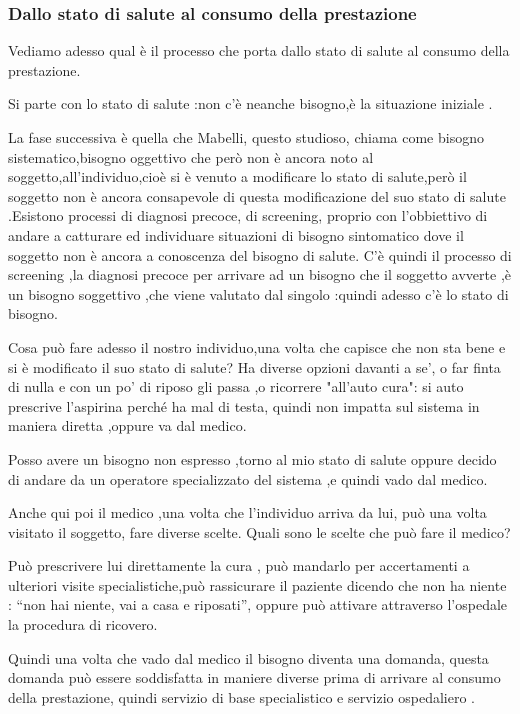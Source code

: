 \subsubsection{Dallo stato di salute al consumo della prestazione}

Vediamo adesso qual è il processo che porta dallo stato di salute al
consumo della prestazione.

Si parte con lo stato di salute :non c'è neanche bisogno,è la situazione
iniziale .

La fase successiva è quella che Mabelli, questo studioso, chiama come
bisogno sistematico,bisogno oggettivo che però non è ancora noto al
soggetto,all'individuo,cioè si è venuto a modificare lo stato di
salute,però il soggetto non è ancora consapevole di questa modificazione
del suo stato di salute .Esistono processi di diagnosi precoce, di
screening, proprio con l'obbiettivo di andare a catturare ed individuare
situazioni di bisogno sintomatico dove il soggetto non è ancora a
conoscenza del bisogno di salute. C'è quindi il processo di screening
,la diagnosi precoce per arrivare ad un bisogno che il soggetto avverte
,è un bisogno soggettivo ,che viene valutato dal singolo :quindi adesso
c'è lo stato di bisogno.

Cosa può fare adesso il nostro individuo,una volta che capisce che non
sta bene e si è modificato il suo stato di salute? Ha diverse opzioni
davanti a se', o far finta di nulla e con un po' di riposo gli passa ,o
ricorrere "all'auto cura": si auto prescrive l'aspirina perché ha mal di
testa, quindi non impatta sul sistema in maniera diretta ,oppure va dal
medico.

Posso avere un bisogno non espresso ,torno al mio stato di salute oppure
decido di andare da un operatore specializzato del sistema ,e quindi
vado dal medico.

Anche qui poi il medico ,una volta che l'individuo arriva da lui, può
una volta visitato il soggetto, fare diverse scelte. Quali sono le
scelte che può fare il medico?

Può prescrivere lui direttamente la cura , può mandarlo per accertamenti
a ulteriori visite specialistiche,può rassicurare il paziente dicendo
che non ha niente : ``non hai niente, vai a casa e riposati'', oppure
può attivare attraverso l'ospedale la procedura di ricovero.

Quindi una volta che vado dal medico il bisogno diventa una domanda,
questa domanda può essere soddisfatta in maniere diverse prima di
arrivare al consumo della prestazione, quindi servizio di base
specialistico e servizio ospedaliero .

